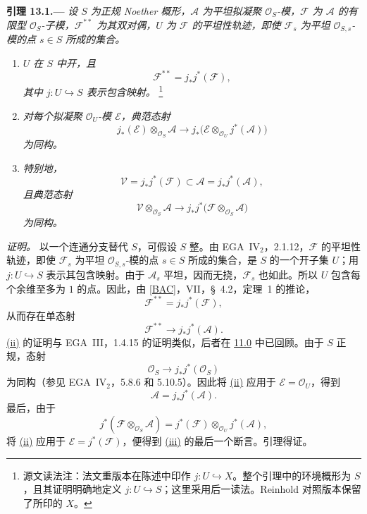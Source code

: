 \medskip
{}\label{lem:sga3-VIB-13.1}%
\noindent\textbf{引理 13.1.---}
\emph{设 \(S\) 为正规 Noether 概形，\(\mathcal A\) 为平坦拟凝聚 \(\mathcal O_S\)-模，\(\mathcal F\) 为 \(\mathcal A\) 的有限型 \(\mathcal O_S\)-子模，\(\mathcal F^{**}\) 为其双对偶，\(U\) 为 \(\mathcal F\) 的平坦性轨迹，即使 \(\mathcal F_s\) 为平坦 \(\mathcal O_{S,s}\)-模的点 \(s\in S\) 所成的集合。}
\begin{enumerate}
\item[\textup{(i)}]\label{concl:sga3-VIB-13.1-i}
  \emph{\(U\) 在 \(S\) 中开，且}
\[
    \mathcal F^{**}=j_*j^*(\mathcal F),
  \]
  \emph{其中 \(j:U\hookrightarrow S\) 表示包含映射。}%
  \begingroup
  \renewcommand{\thefootnote}{\fnsymbol{footnote}}%
  \footnote[1]{\label{note:sga3-VIB-13.1-i-U-ambient}
  源文读法注：法文重版本在陈述中印作 \(j:U\hookrightarrow X\)。整个引理中的环境概形为 \(S\)，且其证明明确地定义 \(j:U\hookrightarrow S\)；这里采用后一读法。Reinhold 对照版本保留了所印的 \(X\)。}%
  \endgroup

\item[\textup{(ii)}]\label{concl:sga3-VIB-13.1-ii}
  \emph{对每个拟凝聚 \(\mathcal O_U\)-模 \(\mathcal E\)，典范态射}
  \label{form:sga3-VIB-13.1-projection}%
\[
    j_*(\mathcal E)\otimes_{\mathcal O_S}\mathcal A
      \longrightarrow
    j_*\bigl(\mathcal E\otimes_{\mathcal O_U}j^*(\mathcal A)\bigr)
  \]
  \emph{为同构。}

\item[\textup{(iii)}]\label{concl:sga3-VIB-13.1-iii}
  \emph{特别地，}
\[
    \mathcal V=j_*j^*(\mathcal F)
      \subset \mathcal A=j_*j^*(\mathcal A),
  \]
  \emph{且典范态射}
  \label{form:sga3-VIB-13.1-tensor}%
\[
    \mathcal V\otimes_{\mathcal O_S}\mathcal A
      \longrightarrow
    j_*j^*\bigl(\mathcal F\otimes_{\mathcal O_S}\mathcal A\bigr)
  \]
  \emph{为同构。}
\end{enumerate}

\emph{证明。}
以一个连通分支替代 \(S\)，可假设 \(S\) 整。由 EGA~IV\(_2\)，2.1.12，\(\mathcal F\) 的平坦性轨迹，即使 \(\mathcal F_s\) 为平坦 \(\mathcal O_{S,s}\)-模的点 \(s\in S\) 所成的集合，是 \(S\) 的一个开子集 \(U\)；用 \(j:U\hookrightarrow S\) 表示其包含映射。由于 \(\mathcal A_s\) 平坦，因而无挠，\(\mathcal F_s\) 也如此。所以 \(U\) 包含每个余维至多为 \(1\) 的点。因此，由 \hyperref[bib:sga3-VIB-BAC]{\textup{[BAC]}}，VII，\S~4.2，定理~1 的推论，
\[
  \mathcal F^{**}=j_*j^*(\mathcal F),
\]
从而存在单态射
\[
  \mathcal F^{**}\longrightarrow j_*j^*(\mathcal A).
\]
\hyperref[concl:sga3-VIB-13.1-ii]{\textup{(ii)}} 的证明与 EGA~III，1.4.15 的证明类似，后者在 \hyperref[par:sga3-VIB-11.0]{11.0} 中已回顾。由于 \(S\) 正规，态射
\[
  \mathcal O_S\longrightarrow j_*j^*(\mathcal O_S)
\]
为同构\textup{（参见 EGA~IV\(_2\)，5.8.6 和 5.10.5）}。因此将 \hyperref[concl:sga3-VIB-13.1-ii]{\textup{(ii)}} 应用于 \(\mathcal E=\mathcal O_U\)，得到
\[
  \mathcal A=j_*j^*(\mathcal A).
\]
最后，由于
\[
  j^*(\mathcal F\otimes_{\mathcal O_S}\mathcal A)
  =
  j^*(\mathcal F)\otimes_{\mathcal O_U}j^*(\mathcal A),
\]
将 \hyperref[concl:sga3-VIB-13.1-ii]{\textup{(ii)}} 应用于 \(\mathcal E=j^*(\mathcal F)\)，便得到 \hyperref[concl:sga3-VIB-13.1-iii]{\textup{(iii)}} 的最后一个断言。引理得证。

